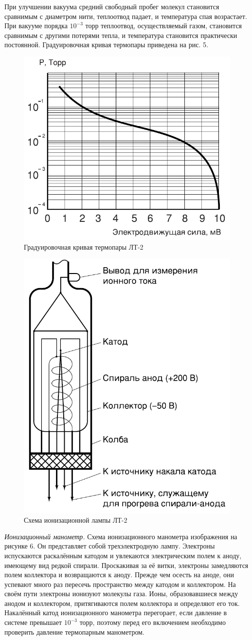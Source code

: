 \documentclass[12pt]{article}
\begin{document}
 При улучшении вакуума средний свободный пробег молекул становится сравнимым с диаметром нити, теплоотвод падает, и температура спая возрастает. При вакууме порядка $10^{-3}$ торр теплоотвод, осуществляемый газом, становится сравнимым с другими потерями тепла, и температура становится практически постоянной. Градуировочная кривая термопары приведена на рис. 5. \\
 \begin{figure}[!h]
 	\centering
 	\includegraphics[width=0.4\linewidth]{градуировочная кривая.PNG}
 	\caption[]{Градуировочная кривая термопары ЛТ-2}
 	\label{fig:Градуировочная кривая}
 \end{figure}
 \begin{figure}[H] %
	\begin{center}
		\includegraphics[width=0.4\linewidth]{лампа.PNG}
		\caption{Схема ионизационной лампы ЛТ-2}
		\label{fig:лампа}
	\end{center}
\end{figure}
\textit{Ионизационный манометр.} Схема ионизационного манометра изображения на рисунке 6. Он представляет собой трехэлектродную лампу. Электроны испускаются раскалённым катодом и увлекаются электрическим полем к аноду, имеющему вид редкой спирали. Проскакивая за её витки, электроны замедляются полем коллектора и возвращаются к аноду. Прежде чем осесть на аноде, они успевают много раз пересечь пространство между катодом и коллектором. На своём пути электроны ионизуют молекулы газа. Ионы, образовавшиеся между анодом и коллектором, притягиваются полем коллектора и определяют его ток. \\
  Накалённый катод ионизационного манометра перегорает, если давление в системе превышает $10^{-3}$ торр, поэтому перед его включением необходимо проверить давление термопарным манометром. \\
\end{document}
